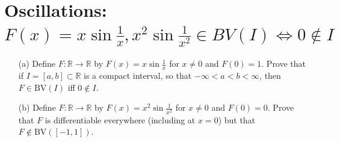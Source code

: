\documentclass[lang=cn,11pt]{elegantbook}
\begin{document}
\section{Oscillations: $F(x)=x\sin\frac1{x},x^2\sin\frac1{x^2}\in BV(I) \iff 0\not \in I$ }
  \begin{itemize}
  \item[(a)] Define $F\colon \mathbb{R} \to \mathbb{R}$ by $F(x)=x\sin\frac1{x}$ for $x\ne 0$ and $F(0)=1$. Prove that if $I=[a,b]\subset \mathbb{R}$ is a compact interval, so that $-\infty<a<b<\infty$, then $F\in\mathrm{BV}(I)$ iff $0\not\in I$.
  \item[(b)]Define $F\colon\mathbb{R} \to \mathbb{R}$ by $F(x)=x^2\sin\frac1{x^2}$ for $x\ne 0$ and $F(0)=0$. Prove that $F$ is differentiable everywhere (including at $x=0$) but that $F\not\in\mathrm{BV}([-1,1])$.
  \end{itemize}
\end{document}
